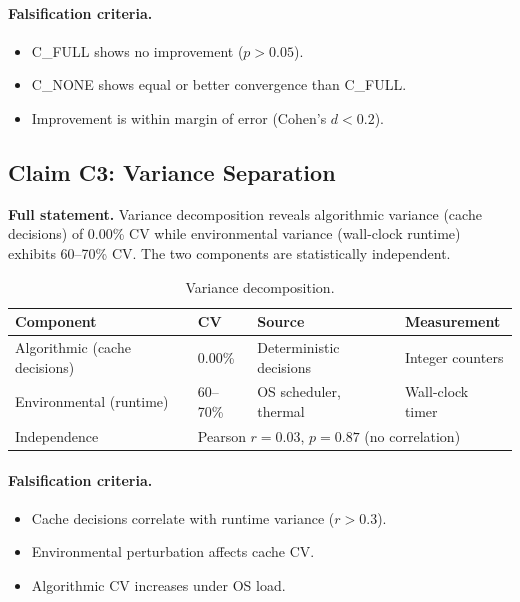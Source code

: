 \paragraph{Falsification criteria.}
\begin{itemize}
  \item C\_FULL shows no improvement ($p > 0.05$).
  \item C\_NONE shows equal or better convergence than C\_FULL.
  \item Improvement is within margin of error (Cohen's $d < 0.2$).
\end{itemize}

\subsection{Claim C3: Variance Separation}

\textbf{Full statement.} Variance decomposition reveals algorithmic variance
(cache decisions) of 0.00\% CV while environmental variance (wall-clock
runtime) exhibits 60--70\% CV. The two components are statistically
independent.

\begin{table}[h]
\centering
\caption{Variance decomposition.}
\begin{tabular}{llll}
\toprule
\textbf{Component} & \textbf{CV} & \textbf{Source} & \textbf{Measurement} \\
\midrule
Algorithmic (cache decisions) & 0.00\% & Deterministic decisions & Integer counters \\
Environmental (runtime) & 60--70\% & OS scheduler, thermal & Wall-clock timer \\
Independence & \multicolumn{3}{l}{Pearson $r = 0.03$, $p = 0.87$ (no correlation)} \\
\bottomrule
\end{tabular}
\end{table}

\paragraph{Falsification criteria.}
\begin{itemize}
  \item Cache decisions correlate with runtime variance ($r > 0.3$).
  \item Environmental perturbation affects cache CV.
  \item Algorithmic CV increases under OS load.
\end{itemize}

